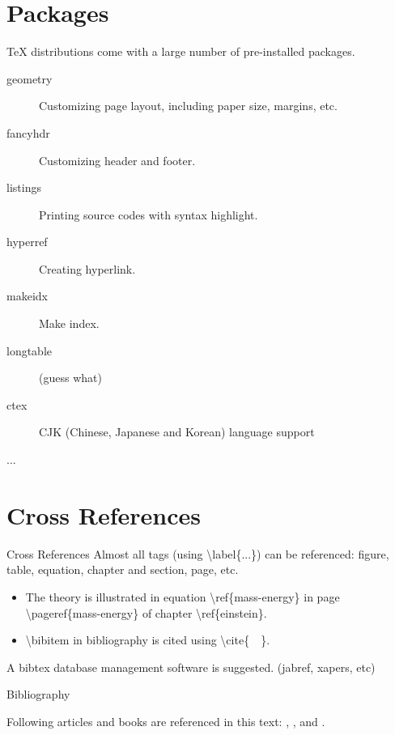 \documentclass[10pt]{beamer}
\begin{document}
\section{Packages}
\begin{frame}
    \TeX{} distributions come with a large number of pre-installed packages.
\begin{description}
    \item [geometry] Customizing page layout, including paper size,
        margins, etc.
    \item [fancyhdr] Customizing header and footer.
    \item [listings] Printing source codes with syntax highlight.
    \item [hyperref] Creating hyperlink.
    \item [makeidx] Make index.
    \item [longtable] (guess what)
    \item [ctex] CJK (Chinese, Japanese and Korean) language support
    \item [...]
\end{description}
\end{frame}

\section{Cross References}
\begin{frame}{Cross References}
    Almost all tags (using \textbackslash label\{...\})
    can be referenced: figure, table, equation,
    chapter and section, page, etc.
\begin{itemize}
    \item The theory is illustrated in equation
        \alert{\textbackslash ref\{mass-energy\}} in page 
        \alert{\textbackslash pageref\{mass-energy\}} of chapter
        \alert{\textbackslash ref\{einstein\}}.

    \item \textbackslash bibitem in bibliography is cited using
        \textbackslash cite\{\ \ \}.
\end{itemize}
A bibtex database management software is suggested.
(jabref, xapers, etc)
\end{frame}

\begin{frame}{Bibliography}

 Following articles and books are referenced in this text:
    \cite{Knuth_texbook}, \cite{texmanual}, \cite{David_tex_land} and
    \cite{website:top500}.


    
    
\end{frame}
\end{document}
